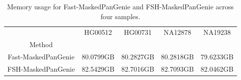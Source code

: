\documentclass[PhD]{PHlab-thesis}
\begin{document}
\begin{table}[ht!]
	\centering
	\begin{tabular*}{\textwidth}{@{\extracolsep{\fill}}ccccc@{\extracolsep{\fill}}}
        \toprule
         & HG00512 & HG00731 & NA12878 & NA19238 \\
         Method & & & & \\
        \midrule
        Fast-MaskedPanGenie& 80.0799GB & 80.2827GB & 80.2818GB & 79.6233GB\\
        FSH-MaskedPanGenie& 82.5429GB & 82.7016GB & 82.7093GB & 82.0462GB\\
        \bottomrule 
	\end{tabular*}
	\caption{Memory usage for Fast-MaskedPanGenie and FSH-MaskedPanGenie across four samples.}
	\label{table:Memory-FSH}
\end{table}
\end{document}
